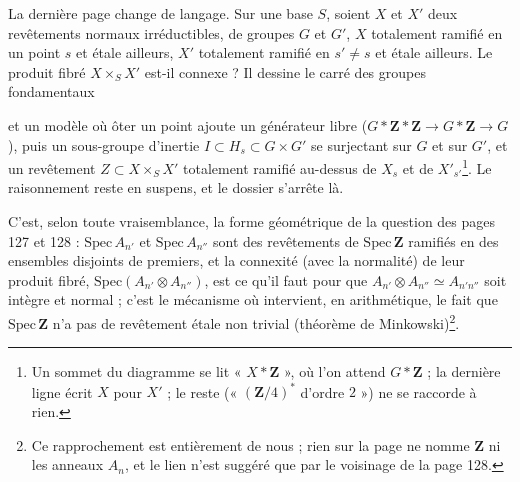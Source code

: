 \documentclass[11pt,a4paper]{article}
\begin{document}
La dernière page change de langage. Sur une base $S$, soient $X$ et $X'$ deux
revêtements normaux irréductibles, de groupes $G$ et $G'$, $X$ totalement
ramifié en un point $s$ et étale ailleurs, $X'$ totalement ramifié en $s' \neq
s$ et étale ailleurs. Le produit fibré $X \times_S X'$ est-il connexe ? Il
dessine le carré des groupes fondamentaux
et un modèle où ôter un point ajoute un générateur libre ($G * \mathbf{Z} *
\mathbf{Z} \to G * \mathbf{Z} \to G$), puis un sous-groupe d'inertie $I
\subset H_s \subset G \times G'$ se surjectant sur $G$ et sur $G'$, et un
revêtement $Z \subset X \times_S X'$ totalement ramifié au-dessus de $X_s$ et
de $X'_{s'}$\footnote{Un sommet du diagramme se lit « $X * \mathbf{Z}$ », où
l'on attend $G * \mathbf{Z}$ ; la dernière ligne écrit $X$ pour $X'$ ; le
reste (« $(\mathbf{Z}/4)^{*}$ d'ordre $2$ ») ne se raccorde à rien.}. Le
raisonnement reste en suspens, et le dossier s'arrête là.

C'est, selon toute vraisemblance, la forme géométrique de la question des
pages 127 et 128 : $\mathrm{Spec}\, A_{n'}$ et $\mathrm{Spec}\, A_{n''}$ sont
des revêtements de $\mathrm{Spec}\, \mathbf{Z}$ ramifiés en des ensembles
disjoints de premiers, et la connexité (avec la normalité) de leur produit
fibré, $\mathrm{Spec}(A_{n'} \otimes A_{n''})$, est ce qu'il faut pour que
$A_{n'} \otimes A_{n''} \simeq A_{n'n''}$ soit intègre et normal ; c'est le
mécanisme où intervient, en arithmétique, le fait que $\mathrm{Spec}\,
\mathbf{Z}$ n'a pas de revêtement étale non trivial (théorème de
Minkowski)\footnote{Ce rapprochement est entièrement de nous ; rien sur la page
ne nomme $\mathbf{Z}$ ni les anneaux $A_n$, et le lien n'est suggéré que par
le voisinage de la page 128.}.
\end{document}
